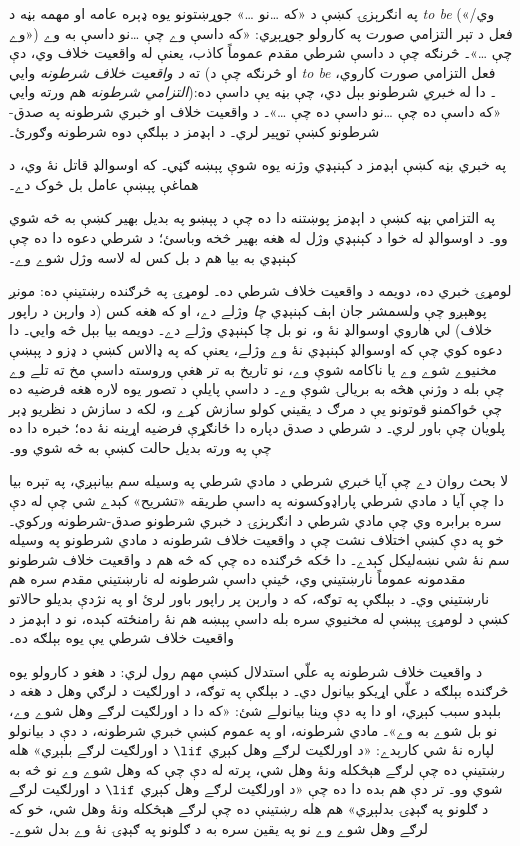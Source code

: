 \documentclass[../../../include/open-logic-section]{subfiles}
\begin{document}


په انګرېزۍ کښې د «که \dots نو \dots» جوړښتونو يوه ډېره عامه او
مهمه بڼه د \emph{to be} («وي/وے») فعل د تېر التزامي صورت په کارولو جوړېږي:
«که داسې وے چې \dots نو داسې به وے چې \dots»۔ څرنګه چې د داسې
شرطي مقدم عموماً کاذب، يعنې له واقعيت خلاف وي، دې ته
\emph{د واقعيت خلاف شرطونه} وايي (او څرنګه چې د \emph{to be}
فعل التزامي صورت کاروي، \emph{التزامي شرطونه} هم ورته وايي)۔
دا له \emph{خبري} شرطونو بېل دي، چې بڼه يې داسې
ده: «که داسې ده چې \dots نو داسې ده چې \dots»۔ د واقعيت خلاف او
خبري شرطونه په صدق-شرطونو کښې توپير لري۔ د اېډمز د بېلګې دوه شرطونه وګورئ۔
\begin{explain}
  په خبري بڼه کښې اېډمز د کېنېډي وژنه يوه شوې پېښه ګڼي۔
  که اوسوالډ قاتل نۀ وي، د هماغې پېښې عامل بل څوک دے۔

  په التزامي بڼه کښې د اېډمز پوښتنه دا ده چې د پېښو په بديل
  بهير کښې به څه شوي وو۔ د اوسوالډ له خوا د کېنېډي وژل له
  هغه بهير څخه وباسئ؛ د شرطي دعوه دا ده چې کېنېډي به بيا هم
  د بل کس له لاسه وژل شوے وے۔
\end{explain}
لومړۍ خبري ده، دويمه د واقعيت خلاف شرطي ده۔ لومړۍ په څرګنده
رښتينې ده: مونږ پوهېږو چې ولسمشر جان اېف کېنېډي \emph{چا} وژلے
دے، او که هغه کس (د وارېن د راپور خلاف) لي هاروي اوسوالډ نۀ و، نو
بل چا کېنېډي وژلے دے۔ دويمه بيا بېل څه وايي۔ دا دعوه کوي چې که
اوسوالډ کېنېډي نۀ وے وژلے، يعنې که په ډالاس کښې د ډزو د پېښې
مخنيوے شوے وے يا ناکامه شوې وے، نو تاريخ به تر هغې وروسته داسې
مخ ته تلے وے چې بله د وژنې هڅه به بريالۍ شوې وے۔ د داسې
پايلې د تصور يوه لاره هغه فرضيه ده چې ځواکمنو قوتونو يې د
مرګ د يقيني کولو سازش کړے و، لکه د سازش د نظريو ډېر پلويان
چې باور لري۔ د شرطي د صدق دپاره دا ځانګړې فرضيه اړينه نۀ
ده؛ خبره دا ده چې په ورته بديل حالت کښې به څه شوي وو۔

لا بحث روان دے چې آيا \emph{خبري} شرطي د مادي شرطي په وسيله سم
بيانېږي، په تېره بيا دا چې آيا د مادي شرطي پاراډوکسونه په داسې
طريقه «تشريح» کېدے شي چې له دې سره برابره وي چې مادي شرطي د
انګرېزۍ د خبري شرطونو صدق-شرطونه ورکوي۔ خو په دې کښې اختلاف نشت
چې د واقعيت خلاف شرطونه د مادي شرطونو په وسيله سم نۀ شي
نښه‌ليکل کېدے۔ دا ځکه څرګنده ده چې که څه هم د واقعيت خلاف شرطونو
مقدمونه عموماً نارښتيني وي، ځينې داسې شرطونه له نارښتيني
مقدم سره هم نارښتيني وي۔ د بېلګې په توګه، که د وارېن پر راپور
باور لرئ او په نژدې بديلو حالاتو کښې د لومړۍ پېښې له
مخنيوي سره بله داسې پېښه هم نۀ رامنځته کېده، نو د اېډمز د
واقعيت خلاف شرطي يې يوه بېلګه ده۔

د واقعيت خلاف شرطونه په علّي استدلال کښې مهم رول لري: د هغو د
کارولو يوه څرګنده بېلګه د علّي اړيکو بيانول دي۔ د بېلګې په توګه،
د اورلګيت د لرګي وهل د هغه د بلېدو سبب کېږي، او دا په دې وينا
بيانولے شئ: «که دا د اورلګيت لرګے وهل شوے وے، نو بل شوے به وے»۔
مادي شرطونه، او په عموم کښې خبري شرطونه، د دې د بيانولو لپاره
نۀ شي کارېدے: «د اورلګيت لرګے وهل کېږي $\lif$ د اورلګيت لرګے
بلېږي» هله رښتينې ده چې لرګے هېڅکله ونۀ وهل شي، پرته له دې چې
که وهل شوے وے نو څه به شوي وو۔ تر دې هم بده دا ده چې «د
اورلګيت لرګے وهل کېږي $\lif$ د اورلګيت لرګے د ګلونو په ګېډۍ
بدلېږي» هم هله رښتينې ده چې لرګے هېڅکله ونۀ وهل شي، خو که لرګے
وهل شوے وے نو په يقين سره به د ګلونو په ګېډۍ نۀ وے بدل شوے۔
\end{document}

